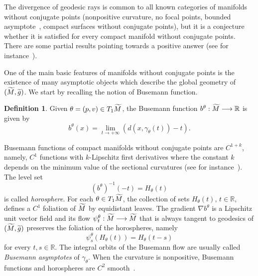 \documentclass[10pt]{amsart}
\theoremstyle{definition}
\newtheorem{defi}[cdrthm]{Definition}
\newcommand{\bbR}{\mathbb{R}}
\let\oldtilde\tilde
\renewcommand*{\tilde}[1]{\mathchoice{\widetilde{#1}}{\widetilde{#1}}{\oldtilde{#1}}{\oldtilde{#1}}}
\begin{document}
The divergence of geodesic rays is common to all known categories of manifolds without conjugate points (nonpositive curvature, no focal points, bounded asymptote~\cite{kn:Eschenburg}, compact surfaces without conjugate points), but it is a conjecture whether it is satisfied for every compact manifold without conjugate points. There are some partial results pointing towards a positive answer (see for instance~\cite{kn:Ruggiero-div}).

One of the main basic features of manifolds without conjugate points is the existence of many asymptotic objects which describe the global geometry of $(\tilde{M}, \tilde{g})$. We start by recalling the notion of Busemann function.

\begin{defi}\label{busemann}
Given $\theta = (p,v) \in T_{1}\tilde{M}$, the Busemann function $b^{\theta} : \tilde{M} \longrightarrow \bbR$ is given by
\[
b^{\theta}(x) = \lim_{t\rightarrow +\infty} (d(x,\gamma_{\theta}(t)) -t).
\]
\end{defi}

Busemann functions of compact manifolds without conjugate points are $C^{1+k}$, namely, $C^{1}$ functions with $k$-Lipschitz first derivatives where the constant $k$ depends on the minimum value of the sectional curvatures (see for instance~\cite[Section~6]{kn:Pesin}). The level set
\[
(b^{\theta})^{-1}(-t)= H_{\theta}(t)
\]
is called \emph{horosphere}. For each $\theta \in T_{1}\tilde{M}$, the collection of sets $H_{\theta}(t)$, $t \in \bbR$, defines a $C^{1}$ foliation of $\tilde{M}$ by equidistant leaves. The gradient $\nabla b^{\theta}$ is a Lipschitz unit vector field and its flow $\psi^{\theta}_{t}: \tilde{M} \longrightarrow \tilde{M}$ that is always tangent to geodesics of $(\tilde{M}, \tilde{g})$ preserves the foliation of the horospheres, namely
\[
\psi^{\theta}_{s}(H_{\theta}(t)) = H_{\theta}(t-s)
\]
for every $t, s \in \bbR$. The integral orbits of the Busemann flow are usually called \emph{Busemann asymptotes} of $\gamma_{\theta}$. When the curvature is nonpositive, Busemann functions and horospheres are $C^{2}$ smooth~\cite{kn:Eschenburg}.
\end{document}
